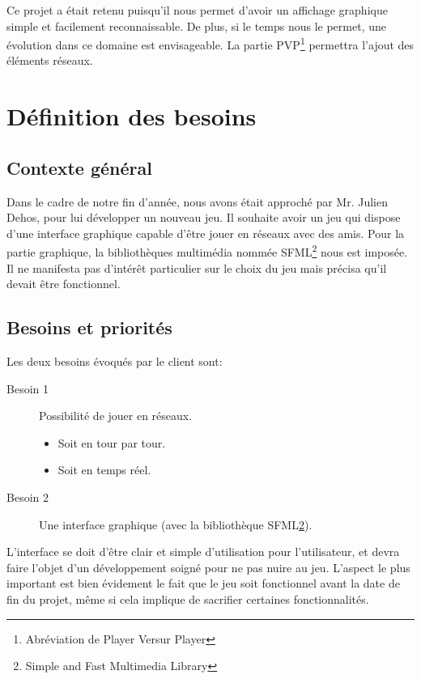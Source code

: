 \documentclass[french, 11pt]{article}
\begin{document}
		Ce projet a était retenu puisqu'il nous permet d’avoir un affichage graphique simple et facilement reconnaissable.
		De plus, si le temps nous le permet, une évolution dans ce domaine est envisageable.
		La partie PVP\footnote{Abréviation de Player Versur Player} permettra l’ajout des éléments réseaux.
\newpage
	\section{Définition des besoins}
		
		\subsection{Contexte général}
		Dans le cadre de notre fin d’année, nous avons était approché par Mr. Julien Dehos, pour lui
		développer un nouveau jeu.
		Il souhaite avoir un jeu qui dispose d’une interface graphique capable d’être jouer en réseaux avec des amis.
		Pour la partie graphique, la bibliothèques multimédia nommée \og{}SFML\footnote{\label{SFML}Simple and Fast Multimedia Library}\fg{} nous est imposée.
		Il ne manifesta pas d’intérêt particulier sur le choix
		du jeu mais précisa qu’il devait être fonctionnel.
		
		\subsection{Besoins et priorités}
		Les deux besoins évoqués par le client sont:
		\begin{description}
			\item[Besoin 1] Possibilité de jouer en réseaux.
			\begin{itemize}
				\item Soit en tour par tour.
				\item Soit en temps réel.
			\end{itemize}
			\item[Besoin 2] Une interface graphique (avec la bibliothèque SFML\ref{SFML}).
		\end{description}

		L’interface se doit d’être clair et simple d’utilisation pour l’utilisateur, et devra faire l’objet
		d’un développement soigné pour ne pas nuire au jeu.
		L’aspect le plus important est bien évidement le fait que le jeu soit fonctionnel avant la date de fin du projet, même si cela implique de sacrifier certaines fonctionnalités.
		
		\newpage
\end{document}

